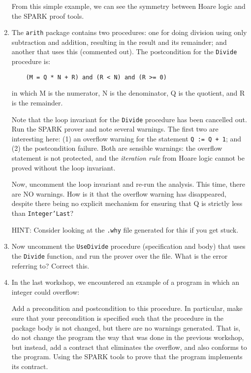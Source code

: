 \documentclass{article}
\def\rootdir{../}
\begin{document}
\begin{enumerate}
From this simple example, we can see the symmetry between  Hoare logic and the SPARK proof tools.

 \item The {\tt arith} package contains two procedures: one for doing division using only subtraction and addition, resulting in the result and its remainder; and another that uses this (commented out). The postcondition for the \texttt{Divide} procedure is:

\verb|    (M = Q * N + R) and (R < N) and (R >= 0)|

in which M is the numerator, N is the denominator, Q is the quotient, and R is the remainder. 

Note that the loop invariant for the \texttt{Divide} procedure has been cancelled out. Run the SPARK prover and note several warnings. The first two are interesting here: (1) an overflow warning for the statement \texttt{Q := Q + 1}; and (2) the postcondition failure. Both are sensible warnings: the overflow statement is not protected, and the \emph{iteration rule} from Hoare logic cannot be proved without the loop invariant.

Now, uncomment the loop invariant and re-run the analysis. This time, there are NO warnings. How is it that the overflow warning has disappeared, despite there being no explicit mechanism for ensuring that Q is strictly less than \texttt{Integer'Last}?

 HINT: Consider looking at the \texttt{.why} file generated for this if you get stuck.

 \item Now uncomment the \texttt{UseDivide} procedure (specification and body) that uses the \texttt{Divide} function, and run the prover over the file. What is the error referring to? Correct this.

 \item In the last workshop, we encountered an example of a program in which an integer could overflow:

 

  Add a precondition and postcondition to this procedure. In particular, make sure that your precondition is specified such that the procedure in the package body is not changed, but there are no warnings generated. That is, do not change the program the way that was done in the previous workshop, but instead, add a contract that eliminates the overflow, and also conforms to the program.   Using the SPARK tools to prove that the program implements its contract.


\end{enumerate}
\end{document}
